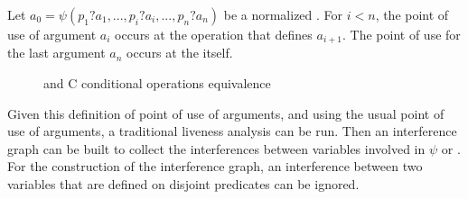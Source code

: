 \begin{definition} Let ${a_0 = \psi(p_1?a_1, ..., p_i?a_i, ...,
  p_n?a_n)}$ be a normalized \psifun. For $i<n$, the point of use of argument $a_i$ occurs at the operation that defines $a_{i+1}$. The point of use
  for the last argument $a_n$ occurs at the \psifun itself.
\end{definition}

\begin{figure}
\begin{center}
\footnotesize\hfill
{}
\hfill
{}
\caption{\psifuns and C conditional operations equivalence}
\label{fig:psi_ccond}
\end{center}
\end{figure}

Given this definition of point of use of \psifun arguments, and using
the usual point of use of \phifun arguments, a traditional liveness
analysis can be run. Then an interference graph can be built to
collect the interferences between variables involved in $\psi$ or
\phifuns. For the construction of the interference graph, an
interference between two variables that are defined on disjoint
predicates can be ignored.

